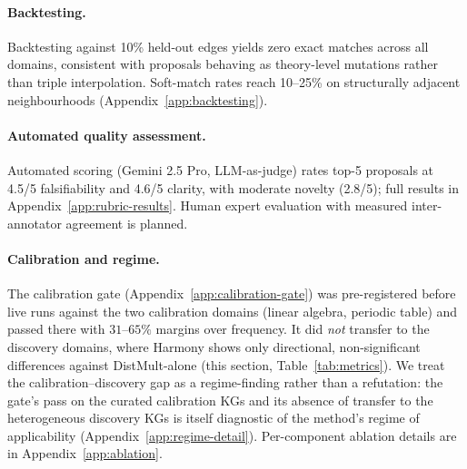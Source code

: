 \paragraph{Backtesting.}
Backtesting against 10\% held-out edges yields zero exact matches across all
domains, consistent with proposals behaving as theory-level mutations rather
than triple interpolation.  Soft-match rates reach 10--25\% on structurally adjacent
neighbourhoods (Appendix~\ref{app:backtesting}).

\paragraph{Automated quality assessment.}
Automated scoring (Gemini 2.5 Pro, LLM-as-judge) rates top-5 proposals at
4.5/5 falsifiability and 4.6/5 clarity, with moderate novelty (2.8/5);
full results in Appendix~\ref{app:rubric-results}.  Human expert evaluation
with measured inter-annotator agreement is planned.

\paragraph{Calibration and regime.}
The calibration gate (Appendix~\ref{app:calibration-gate}) was
pre-registered before live runs against the two calibration domains
(linear algebra, periodic table) and passed there with $31$--$65\%$
margins over frequency.  It did \emph{not} transfer to the discovery
domains, where Harmony shows only directional, non-significant
differences against DistMult-alone (this section, Table~\ref{tab:metrics}).
We treat the calibration--discovery gap as a regime-finding rather than
a refutation: the gate's pass on the curated calibration KGs and its absence
of transfer to the heterogeneous discovery KGs is itself diagnostic of the
method's regime of applicability
(Appendix~\ref{app:regime-detail}).  Per-component ablation details
are in Appendix~\ref{app:ablation}.
